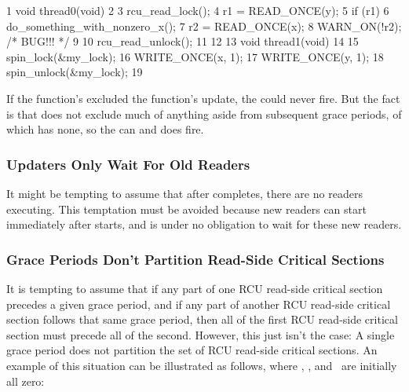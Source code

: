 \begin{VerbatimN}
       1 void thread0(void)
       2 {
       3   rcu_read_lock();
       4   r1 = READ_ONCE(y);
       5   if (r1) {
       6     do_something_with_nonzero_x();
       7     r2 = READ_ONCE(x);
       8     WARN_ON(!r2); /* BUG!!! */
       9   }
      10   rcu_read_unlock();
      11 }
      12
      13 void thread1(void)
      14 {
      15   spin_lock(&my_lock);
      16   WRITE_ONCE(x, 1);
      17   WRITE_ONCE(y, 1);
      18   spin_unlock(&my_lock);
      19 }
\end{VerbatimN}

If the  function's  excluded the
 function's update, the  could never fire.
But
the fact is that  does not exclude much of anything
aside from subsequent grace periods, of which  has none, so
the  can and does fire.


\subsubsection{Updaters Only Wait For Old Readers}

It might be tempting to assume that after 
completes, there are no readers executing.
This temptation must be
avoided because new readers can start immediately after
 starts, and  is under no
obligation to wait for these new readers.

\QuickQuizEnd


\subsubsection{Grace Periods Don't Partition Read-Side Critical Sections}

It is tempting to assume that if any part of one RCU read-side critical
section precedes a given grace period, and if any part of another RCU
read-side critical section follows that same grace period, then all of
the first RCU read-side critical section must precede all of the second.
However, this just isn't the case:
A single grace period does not
partition the set of RCU read-side critical sections.
An example of this
situation can be illustrated as follows, where , , and~
are initially all zero:

